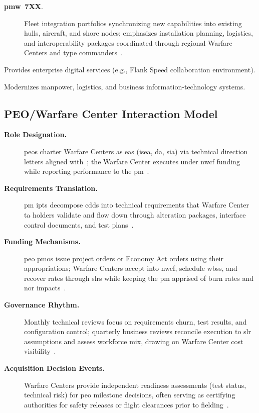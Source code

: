 \documentclass[../main.tex]{subfiles}
\begin{document}
\begin{description}
\begin{description}
            \item[\textbf{\ac{pmw}~7XX}.] Fleet integration portfolios synchronizing new capabilities into existing hulls, aircraft, and shore nodes; emphasizes installation planning, logistics, and interoperability packages coordinated through regional Warfare Centers and type commanders~\autocite{SECNAV5400-15D,edo-3-1-5-field-activity-fm-2025}.
          \end{description}
    \item[\textbf{\ac{peodigital}.}] Provides enterprise digital services (e.g., Flank Speed collaboration environment).
    \item[\textbf{\ac{peomlb}.}] Modernizes manpower, logistics, and business information-technology systems.
  \end{description}

  \subsection{PEO/Warfare Center Interaction Model}
  \begin{description}
    \item[\textbf{Role Designation.}] \acp{peo} charter Warfare Centers as \acp{ea} (\ac{isea}, \ac{da}, \ac{sia}) via technical direction letters aligned with~\autocite{SECNAV5400-15D}; the Warfare Center executes under \ac{nwcf} funding while reporting performance to the \ac{pm}~\autocite{edo-2-1-4-warfare-centers-2024}.
    \item[\textbf{Requirements Translation.}] \ac{pm} \acp{ipt} decompose \acp{cdd} into technical requirements that Warfare Center \ac{ta} holders validate and flow down through alteration packages, interface control documents, and test plans~\autocite{edo-2-1-4-warfare-centers-2024}.
    \item[\textbf{Funding Mechanisms.}] \ac{peo} \acp{pmo} issue project orders or Economy Act orders using their appropriations; Warfare Centers accept into \ac{nwcf}, schedule \acp{wbs}, and recover rates through \acp{slr} while keeping the \ac{pm} apprised of burn rates and \ac{nor} impacts~\autocite{edo-3-1-5-field-activity-fm-2025}.
    \item[\textbf{Governance Rhythm.}] Monthly technical reviews focus on requirements churn, test results, and configuration control; quarterly business reviews reconcile execution to \ac{slr} assumptions and assess workforce mix, drawing on Warfare Center cost visibility~\autocite{SECNAV5400-15D,edo-3-1-5-field-activity-fm-2025}.
    \item[\textbf{Acquisition Decision Events.}] Warfare Centers provide independent readiness assessments (test status, technical risk) for \ac{peo} milestone decisions, often serving as certifying authorities for safety releases or flight clearances prior to fielding~\autocite{SECNAV5400-15D,edo-2-1-4-warfare-centers-2024}.
  \end{description}
\end{document}
